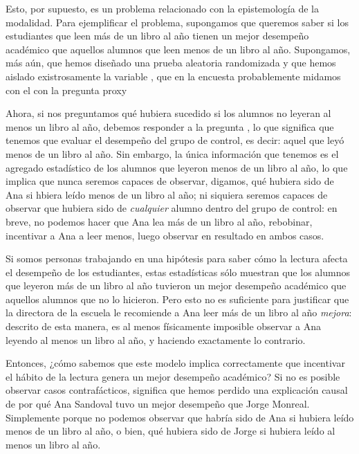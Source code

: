 Esto, por supuesto, es un problema relacionado con la epistemología de la modalidad. Para ejemplificar el problema, supongamos que queremos saber si los estudiantes que leen más de un libro al año tienen un mejor desempeño
académico que aquellos alumnos que leen menos de un libro al año.
Supongamos, más aún, que hemos diseñado una prueba aleatoria
randomizada y que hemos aislado existrosamente la variable , que en la encuesta probablemente midamos con
el con la pregunta proxy 

Ahora, si nos preguntamos qué hubiera sucedido si los alumnos no
leyeran al menos un libro al año, debemos responder a la pregunta
, lo que significa que tenemos que
evaluar el desempeño del grupo de control, es decir: aquel que leyó
menos de un libro al año. Sin embargo, la única información que
tenemos es el agregado estadístico de los alumnos que leyeron menos
de un libro al año, lo que implica que nunca seremos capaces de
observar, digamos, qué hubiera sido de Ana si hbiera leído menos de
un libro al año; ni siquiera seremos capaces de observar que hubiera sido  de \emph{cualquier} alumno dentro del grupo de control: en breve, no podemos hacer que Ana lea más de un libro al año, rebobinar, incentivar a Ana a leer menos, luego observar en resultado en ambos casos.

Si somos personas trabajando en una hipótesis para saber cómo la lectura afecta el desempeño de los estudiantes, estas estadísticas sólo muestran que los alumnos que leyeron más de un libro al año tuvieron un mejor desempeño académico que aquellos alumnos que no lo hicieron. Pero esto no es suficiente para justificar que la directora de la escuela le recomiende a Ana leer más de un libro al año \emph{mejora}: descrito de esta manera, es al menos físicamente imposible observar a Ana leyendo al menos un libro al año, y haciendo exactamente lo contrario.

Entonces, ¿cómo sabemos que este modelo implica correctamente que
incentivar el hábito de la lectura genera un mejor desempeño
académico? Si no es posible observar casos contrafácticos, significa
que hemos perdido una explicación causal de por qué Ana Sandoval tuvo
un mejor desempeño que Jorge Monreal. Simplemente porque no podemos
observar que habría sido de Ana si hubiera leído menos de un libro al
año, o bien, qué hubiera sido de Jorge si hubiera leído al menos un
libro al año.

